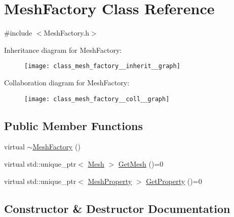 \hypertarget{class_mesh_factory}{}\section{Mesh\+Factory Class Reference}
\label{class_mesh_factory}


{\ttfamily \#include $<$Mesh\+Factory.\+h$>$}



Inheritance diagram for Mesh\+Factory\+:\nopagebreak
\begin{figure}[H]
\begin{center}
\leavevmode
\texttt{[image: class\_mesh\_factory\_\_inherit\_\_graph]}
\end{center}
\end{figure}


Collaboration diagram for Mesh\+Factory\+:\nopagebreak
\begin{figure}[H]
\begin{center}
\leavevmode
\texttt{[image: class\_mesh\_factory\_\_coll\_\_graph]}
\end{center}
\end{figure}
\subsection*{Public Member Functions}
\begin{DoxyCompactItemize}
\item 
virtual \mbox{\hyperlink{class_mesh_factory_ad1c44f90fbd6b710a422371dc02eb9c3}{$\sim$\+Mesh\+Factory}} ()
\item 
virtual std\+::unique\+\_\+ptr$<$ \mbox{\hyperlink{class_mesh}{Mesh}} $>$ \mbox{\hyperlink{class_mesh_factory_a4cc58b609d0f4f5209cf5245e16f0720}{Get\+Mesh}} ()=0
\item 
virtual std\+::unique\+\_\+ptr$<$ \mbox{\hyperlink{class_mesh_property}{Mesh\+Property}} $>$ \mbox{\hyperlink{class_mesh_factory_abff50d215458843dd98271ab803a7671}{Get\+Property}} ()=0
\end{DoxyCompactItemize}


\subsection{Constructor \& Destructor Documentation}
\mbox{\label{class_mesh_factory_ad1c44f90fbd6b710a422371dc02eb9c3}} 
